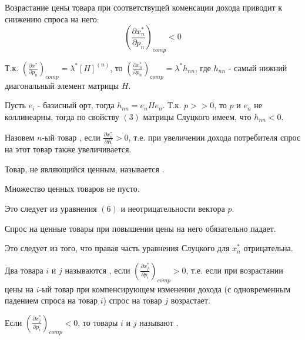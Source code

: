 \begin{conseq}[]\label{cha:3/conseq:1}
	Возрастание цены товара при соответствущей коменсации дохода приводит к снижению спроса на него:
	$$\left(\frac{\partial x_n^{*}}{\partial p_n}\right)_{comp} < 0$$
\end{conseq}
\begin{Proof}
	Т.к. $\left(\frac{\partial x^{*}}{\partial p_n}\right)_{comp} = \lambda^{*} [H]^{(n)}$, то $\left(\frac{\partial x_n^{*}}{\partial p_n}\right)_{comp} = \lambda^{*} h_{nn}$, где $h_{nn}$ - самый нижний диагональный элемент матрицы $H$.

	Пусть $e_i$ - базисный орт, тогда $h_{nn} = e_n H e_n$. Т.к. $p >> 0$, то $p$ и $e_n$ не коллинеарны, тогда по свойству $(3)$ матрицы Слуцкого имеем, что $h_{nn} < 0$.
\end{Proof}

\begin{definition}\label{cha:3/def:3}
	Назовем $n$-ый товар , если $\frac{\partial x_n^{*}}{\partial K} > 0$, т.е. при увеличении дохода потребителя спрос на этот товар также увеличивается.

	Товар, не являющийся ценным, называется .
\end{definition}

\begin{conseq}[]\label{cha:3/conseq:2}
	Множество ценных товаров не пусто.
\end{conseq}
\begin{Proof}
	Это следует из уравнения $(6)$ и неотрицательности вектора $p$.
\end{Proof}

\begin{conseq}[]\label{cha:3/conseq:3}
	Спрос на ценные товары при повышении цены на него обязательно падает.
\end{conseq}
\begin{Proof}
	Это следует из того, что правая часть уравнения Слуцкого для $x_n^{*}$ отрицательна.
\end{Proof}

\begin{definition}\label{cha:3/def:4}
	Два товара $i$ и $j$ называются , если $\left(\frac{\partial x_j^{*}}{\partial p_i}\right)_{comp} > 0$, т.е. если при возрастании цены на $i$-ый товар при компенсирующем изменении дохода (с одновременным падением спроса на товар $i$) спрос на товар $j$ возрастает. 

	Если $\left(\frac{\partial x_j^{*}}{\partial p_i}\right)_{comp} < 0$, то товары $i$ и $j$ называют .
\end{definition}

